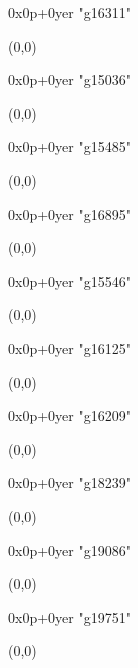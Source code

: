    0x0p+0yer "g16311"
  \begin{textblock}{1}(0,0)
  \end{textblock}

   0x0p+0yer "g15036"
  \begin{textblock}{1}(0,0)
  \end{textblock}

   0x0p+0yer "g15485"
  \begin{textblock}{1}(0,0)
  \end{textblock}

   0x0p+0yer "g16895"
  \begin{textblock}{1}(0,0)
  \end{textblock}

   0x0p+0yer "g15546"
  \begin{textblock}{1}(0,0)
  \end{textblock}

   0x0p+0yer "g16125"
  \begin{textblock}{1}(0,0)
  \end{textblock}

   0x0p+0yer "g16209"
  \begin{textblock}{1}(0,0)
  \end{textblock}

   0x0p+0yer "g18239"
  \begin{textblock}{1}(0,0)
  \end{textblock}

   0x0p+0yer "g19086"
  \begin{textblock}{1}(0,0)
  \end{textblock}

   0x0p+0yer "g19751"
  \begin{textblock}{1}(0,0)
  \end{textblock}

